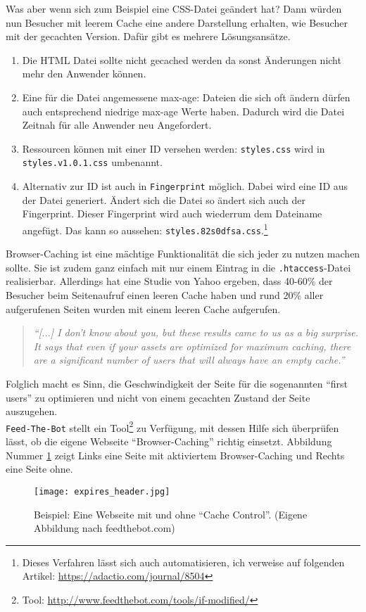		  Was aber wenn sich zum Beispiel eine CSS-Datei geändert hat? Dann würden nun Besucher mit leerem Cache eine andere Darstellung erhalten, wie Besucher mit der gecachten Version. Dafür gibt es mehrere Lösungsansätze.

		  \begin{enumerate}
		  	\item Die HTML Datei sollte nicht gecached werden da sonst Änderungen nicht mehr den Anwender können.
		  	\item Eine für die Datei angemessene max-age: Dateien die sich oft ändern dürfen auch entsprechend niedrige max-age Werte haben. Dadurch wird die Datei Zeitnah für alle Anwender neu Angefordert.
		  	\item Ressourcen können mit einer ID versehen werden: \texttt{styles.css} wird in \texttt{styles.v1.0.1.css} umbenannt.
		  	\item Alternativ zur ID ist auch in \texttt{Fingerprint} möglich. Dabei wird eine ID aus der Datei generiert. Ändert sich die Datei so ändert sich auch der Fingerprint. Dieser Fingerprint wird auch wiederrum dem Dateiname angefügt. Das kann so aussehen: \texttt{styles.82s0dfsa.css}.\footnote{Dieses Verfahren lässt sich auch automatisieren, ich verweise auf folgenden Artikel: \url{https://adactio.com/journal/8504}}
		  \end{enumerate}

		  Browser-Caching ist eine mächtige Funktionalität die sich jeder zu nutzen machen sollte. Sie ist zudem ganz einfach mit nur einem Eintrag in die \texttt{.htaccess}-Datei realisierbar. Allerdings hat eine Studie von Yahoo ergeben, dass 40-60\% der Besucher beim Seitenaufruf einen leeren Cache haben und rund 20\% aller aufgerufenen Seiten wurden mit einem leeren Cache aufgerufen.
			\begin{quote}
				\textit{"`[...] I don't know about you, but these results came to us as a big surprise. It says that even if your assets are optimized for maximum caching, there are a significant number of users that will always have an empty cache."'\autocite{yahoo07}}
			\end{quote}

			Folglich macht es Sinn, die Geschwindigkeit der Seite für die sogenannten "`first users"' zu optimieren und nicht von einem gecachten Zustand der Seite auszugehen.\\
			\texttt{Feed-The-Bot} stellt ein Tool\footnote{Tool: \url{http://www.feedthebot.com/tools/if-modified/}} zu Verfügung, mit dessen Hilfe sich überprüfen lässt, ob die eigene Webseite "`Browser-Caching"' richtig einsetzt. Abbildung Nummer \ref{fig:expires_header} zeigt Links eine Seite mit aktiviertem Browser-Caching und Rechts eine Seite ohne.
		  \begin{figure}[htbp]
		  	\begin{center}
		  		\texttt{[image: expires\_header.jpg]}
		  		\caption{Beispiel: Eine Webseite mit und ohne "`Cache Control"'. (Eigene Abbildung nach feedthebot.com)}
		  		\label{fig:expires_header}
		  	\end{center}
		  \end{figure}
		\pagebreak

